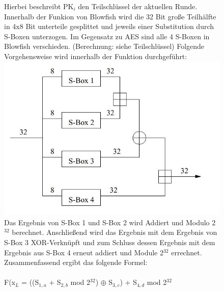 \documentclass[10pt, a4paper,headsepline]{scrreprt}
\begin{document}
\begin{figure}[htbp]
\begin{minipage}[t]{10cm}
Hierbei beschreibt PK$_{i}$ den Teilschlüssel der aktuellen Runde. Innerhalb der Funkion von Blowfish wird die 32 Bit große Teilhälfte in 4x8 Bit unterteile gesplittet und jeweils einer Substitution durch S-Boxen unterzogen. Im Gegensatz zu AES sind alle 4 S-Boxen in Blowfish verschieden. (Berechnung: siehe Teilschlüssel) Folgende Vorgehensweise wird innerhalb der Funktion durchgeführt: \\
\includegraphics[scale=0.25]{blowfish_2.JPG} \\ %
Das Ergebnis von S-Box 1 und S-Box 2 wird Addiert und Modulo 2$^{32}$ berechnet. Anschließend wird das Ergebnis mit dem Ergebnis von S-Box 3 XOR-Verknüpft und zum Schluss dessen Ergebnis mit dem Ergebnis aus S-Box 4 erneut addiert und Module 2$^{32}$ errechnet. Zusammenfassend ergibt das folgende Formel: \\ \\
F(x$_{L}$ = ((S$_{1,a}$ + S$_{2,b}$ mod 2$^{32}$) $\oplus$ S$_{3,c}$) + S$_{4,d}$ mod 2$^{32}$ \\ \\
\end{minipage}
\end{figure}
\end{document}
